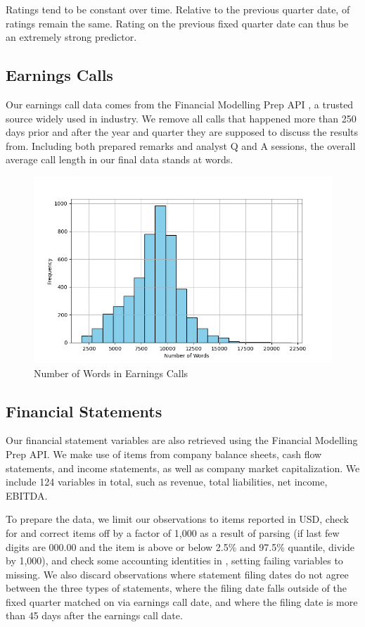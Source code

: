 \documentclass{article}[11pt]
\begin{document}
    Ratings tend to be constant over time. Relative to the previous quarter date, \shareNotChanges \space of ratings remain the same. Rating on the previous fixed quarter date can thus be an extremely strong predictor.

    \subsection*{Earnings Calls}

    Our earnings call data comes from the Financial Modelling Prep API \citep{financial_modeling_prep_financial_2024}, a trusted source widely used in industry. We remove all calls that happened more than 250 days prior and after the year and quarter they are supposed to discuss the results from. Including both prepared remarks and analyst Q and A sessions, the overall average call length in our final data stands at \avgCallLength \space words.

    \begin{figure}[h!]
		\centering
        \caption{Number of Words in Earnings Calls}
        \includegraphics[width=0.6\linewidth,keepaspectratio=true]{../Output/All Data EDA/NLP EDA/all_data_num_words_distribution_no_title.png}
	\end{figure}

    \subsection*{Financial Statements}

    Our financial statement variables are also retrieved using the Financial Modelling Prep API. We make use of items from company balance sheets, cash flow statements, and income statements, as well as company market capitalization. We include 124 variables in total, such as revenue, total liabilities, net income, EBITDA.
    
    To prepare the data, we limit our observations to items reported in USD, check for and correct items off by a factor of 1,000 as a result of parsing (if last few digits are 000.00 and the item is above or below 2.5\% and 97.5\% quantile, divide by 1,000), and check some accounting identities in \cite{das_credit_2023}, setting failing variables to missing. We also discard observations where statement filing dates do not agree between the three types of statements, where the filing date falls outside of the fixed quarter matched on via earnings call date, and where the filing date is more than 45 days after the earnings call date.
\end{document}
